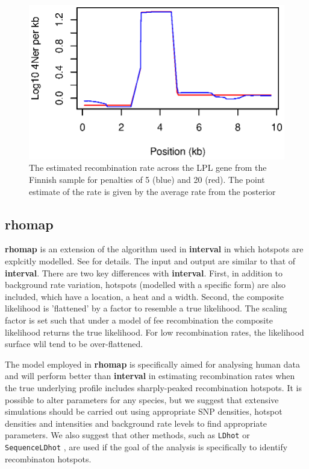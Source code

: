 \documentclass[a4paper,10pt,fullpage]{article}
\begin{document}
\begin{figure}
\linespread{1.3} \centering
\includegraphics[scale=1.0]{LPLinterval.eps}
\caption{The estimated recombination rate across the LPL gene from
the Finnish sample for penalties of 5 (blue) and 20 (red). The
point estimate of the rate is given by the average rate from the
posterior} \label{fig:lpl_interval}
\end{figure}


\subsection{rhomap}

{\bf rhomap} is an extension of the algorithm used in {\bf interval} in which hotspots are explcitly modelled.  See \cite{AutonMcVean07} for details.  The input and output are similar to that of {\bf interval}.   There are two key differences with {\bf interval}.  First, in addition to background rate variation, hotspots (modelled with a specific form) are also included, which have a location, a heat and a width.  Second, the composite likelihood is 'flattened' by a factor to resemble a true likelihood.  The scaling factor is set such that under a model of fee recombination the composite likelihood returns the true likelihood.  For low recombination rates, the likelihood surface wlil tend to be over-flattened.  

The model employed in {\bf rhomap} is specifically aimed for analysing human data and will perform better than {\bf interval} in estimating recombination rates when the true underlying profile includes sharply-peaked recombination hotspots.  It is possible to alter parameters for any species, but we suggest that extensive simulations should be carried out using appropriate SNP densities, hotspot densities and intensities and background rate levels to find appropriate parameters.  We also suggest that other methods, such as \verb+LDhot+ \cite{McVeanetal04, Myersetal05} or \verb+SequenceLDhot+ \cite{Fearnhead06}, are used if the goal of the analysis is specifically to identify recombinaton hotspots.  
\end{document}
